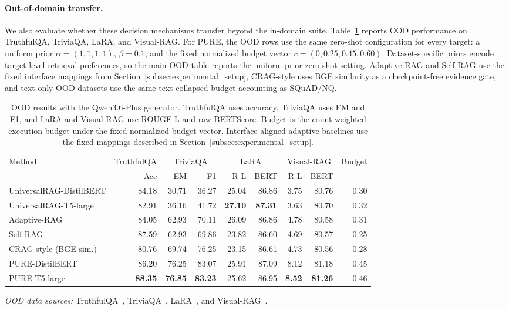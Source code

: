 \documentclass[a4paper,fleqn]{cas-dc}
\begin{document}
\paragraph{Out-of-domain transfer.}
We also evaluate whether these decision mechanisms transfer beyond the in-domain suite. Table~\ref{tab:ood_results} reports OOD performance on TruthfulQA, TriviaQA, LaRA, and Visual-RAG. For PURE, the OOD rows use the same zero-shot configuration for every target: a uniform prior \(\alpha=(1,1,1,1)\), \(\beta=0.1\), and the fixed normalized budget vector \(c=(0,0.25,0.45,0.60)\). Dataset-specific priors encode target-level retrieval preferences, so the main OOD table reports the uniform-prior zero-shot setting. Adaptive-RAG and Self-RAG use the fixed interface mappings from Section~\ref{subsec:experimental_setup}, CRAG-style uses BGE similarity as a checkpoint-free evidence gate, and text-only OOD datasets use the same text-collapsed budget accounting as SQuAD/NQ.

\begin{table}[t]
\centering
\footnotesize
\caption{OOD results with the Qwen3.6-Plus generator. TruthfulQA uses accuracy, TriviaQA uses EM and F1, and LaRA and Visual-RAG use ROUGE-L and raw BERTScore. Budget is the count-weighted execution budget under the fixed normalized budget vector. Interface-aligned adaptive baselines use the fixed mappings described in Section~\ref{subsec:experimental_setup}.}
\label{tab:ood_results}
\begin{tabular*}{\textwidth}{@{\extracolsep{\fill}}lrrrrrrrr@{}}
\toprule
Method & TruthfulQA & \multicolumn{2}{c}{TriviaQA} & \multicolumn{2}{c}{LaRA} & \multicolumn{2}{c}{Visual-RAG} & Budget \\
\cmidrule(lr){3-4}\cmidrule(lr){5-6}\cmidrule(lr){7-8}
 & Acc & EM & F1 & R-L & BERT & R-L & BERT & \\
\midrule
UniversalRAG-DistilBERT & 84.18 & 30.71 & 36.27 & 25.04 & 86.86 & 3.75 & 80.76 & 0.30 \\
UniversalRAG-T5-large & 82.91 & 36.16 & 41.72 & \textbf{27.10} & \textbf{87.31} & 3.63 & 80.70 & 0.32 \\
Adaptive-RAG & 84.05 & 62.93 & 70.11 & 26.09 & 86.86 & 4.78 & 80.58 & 0.31 \\
Self-RAG & 87.59 & 62.93 & 69.86 & 23.82 & 86.60 & 4.69 & 80.57 & 0.25 \\
CRAG-style (BGE sim.) & 80.76 & 69.74 & 76.25 & 23.15 & 86.61 & 4.73 & 80.56 & 0.28 \\
PURE-DistilBERT & 86.20 & 76.25 & 83.07 & 25.91 & 87.09 & 8.12 & 81.18 & 0.45 \\
PURE-T5-large & \textbf{88.35} & \textbf{76.85} & \textbf{83.23} & 25.62 & 86.95 & \textbf{8.52} & \textbf{81.26} & 0.46 \\
\bottomrule
\end{tabular*}
\par\vspace{2pt}
\begin{minipage}{\textwidth}
\scriptsize\emph{OOD data sources:} TruthfulQA~\citep{Lin2022TruthfulQA}, TriviaQA~\citep{Joshi2017TriviaQA}, LaRA~\citep{Li2025LaRA}, and Visual-RAG~\citep{Wu2025VisualRAG}.
\end{minipage}
\end{table}
\end{document}
